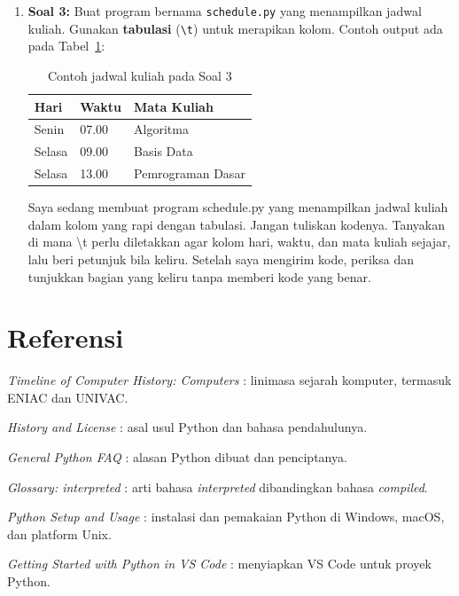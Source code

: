 \begin{enumerate}
\item \textbf{Soal 3:} Buat program bernama \texttt{schedule.py} yang menampilkan jadwal kuliah. Gunakan \textbf{tabulasi} (\texttt{\textbackslash t}) untuk merapikan kolom. Contoh output ada pada Tabel~\ref{tab:b1-jadwal}:

\begin{table}[H]
  \centering
  \caption{Contoh jadwal kuliah pada Soal 3}
  \label{tab:b1-jadwal}
  \begin{tabularx}{\linewidth}{llX}
    \hline
    \textbf{Hari} & \textbf{Waktu} & \textbf{Mata Kuliah} \\
    \hline
    Senin & 07.00 & Algoritma \\
    \hline
    Selasa & 09.00 & Basis Data \\
    \hline
    Selasa & 13.00 & Pemrograman Dasar \\
    \hline
  \end{tabularx}
\end{table}
  \begin{promptterarah}
  Saya sedang membuat program schedule.py yang menampilkan jadwal kuliah dalam kolom yang rapi dengan tabulasi. Jangan tuliskan kodenya. Tanyakan di mana \textbackslash t perlu diletakkan agar kolom hari, waktu, dan mata kuliah sejajar, lalu beri petunjuk bila keliru. Setelah saya mengirim kode, periksa dan tunjukkan bagian yang keliru tanpa memberi kode yang benar.
  \end{promptterarah}
\end{enumerate}

\section*{Referensi}
\begin{daftarrapat}
  \item \textit{Timeline of Computer History: Computers} \cite{chm-timeline}: linimasa sejarah komputer, termasuk ENIAC dan UNIVAC.
  \item \textit{History and License} \cite{py-history}: asal usul Python dan bahasa pendahulunya.
  \item \textit{General Python FAQ} \cite{py-faq-general}: alasan Python dibuat dan penciptanya.
  \item \textit{Glossary: interpreted} \cite{py-glossary-interpreted}: arti bahasa \textit{interpreted} dibandingkan bahasa \textit{compiled}.
  \item \textit{Python Setup and Usage} \cite{py-using}: instalasi dan pemakaian Python di Windows, macOS, dan platform Unix.
  \item \textit{Getting Started with Python in VS Code} \cite{vscode-python}: menyiapkan VS Code untuk proyek Python.
\end{daftarrapat}
